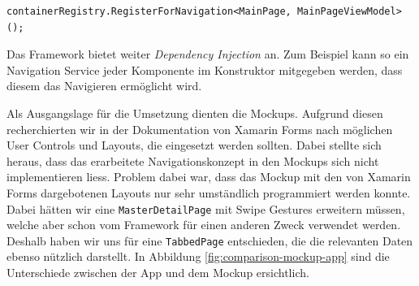 \begin{lstlisting}[label=register-vm,caption=Verknüpfung von View mit ViewModel in Prism.Forms]
containerRegistry.RegisterForNavigation<MainPage, MainPageViewModel>();
\end{lstlisting}

Das Framework bietet weiter \textit{Dependency Injection} an. Zum Beispiel kann so ein Navigation Service jeder Komponente im Konstruktor mitgegeben werden, dass diesem das Navigieren ermöglicht wird. 

Als Ausgangslage für die Umsetzung dienten die Mockups. Aufgrund diesen recherchierten wir in der Dokumentation von Xamarin Forms nach möglichen User Controls und Layouts, die eingesetzt werden sollten. Dabei stellte sich heraus, dass das erarbeitete Navigationskonzept in den Mockups sich nicht implementieren liess. Problem dabei war, dass das Mockup mit den von Xamarin Forms dargebotenen Layouts nur sehr umständlich programmiert werden konnte. Dabei hätten wir eine \texttt{MasterDetailPage} mit Swipe Gestures erweitern müssen, welche aber schon vom Framework für einen anderen Zweck verwendet werden. Deshalb haben wir uns für eine \texttt{TabbedPage} entschieden, die die relevanten Daten ebenso nützlich darstellt. In Abbildung \ref{fig:comparison-mockup-app} sind die Unterschiede zwischen  der App und dem Mockup ersichtlich.


